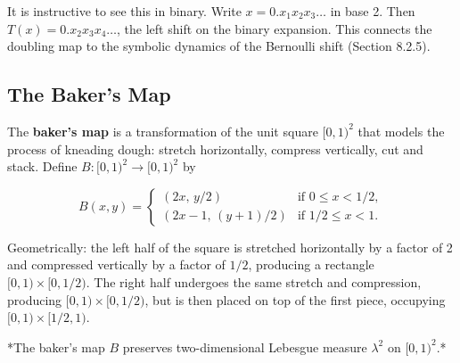 \begin{remark}
It is instructive to see this in binary. Write $x = 0.x_1 x_2 x_3 \ldots$ in base 2. Then $T(x) = 0.x_2 x_3 x_4 \ldots$, the left shift on the binary expansion. This connects the doubling map to the symbolic dynamics of the Bernoulli shift (Section 8.2.5).
\end{remark}


\subsection{The Baker's Map}\label{sec:8.2.3}

The \textbf{baker's map} is a transformation of the unit square $[0,1)^2$ that models the process of kneading dough: stretch horizontally, compress vertically, cut and stack. Define $B: [0,1)^2 \to [0,1)^2$ by

\[
B(x, y) = \begin{cases} (2x, \, y/2) & \text{if } 0 \le x < 1/2, \\ (2x - 1, \, (y+1)/2) & \text{if } 1/2 \le x < 1. \end{cases}
\]

Geometrically: the left half of the square is stretched horizontally by a factor of 2 and compressed vertically by a factor of $1/2$, producing a rectangle $[0,1) \times [0, 1/2)$. The right half undergoes the same stretch and compression, producing $[0,1) \times [0, 1/2)$, but is then placed on top of the first piece, occupying $[0,1) \times [1/2, 1)$.

\begin{proposition}\label{prop:8.9.}
*The baker's map $B$ preserves two-dimensional Lebesgue measure $\lambda^2$ on $[0,1)^2$.*
\end{proposition}


